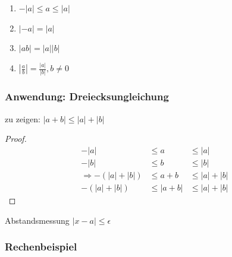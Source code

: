 \begin{enumerate}
 \item $-|a|\leq a \leq |a|$
 \item $|-a| = |a|$
 \item $|ab| = |a||b|$
 \item $\displaystyle\left|\frac{a}{b}\right| = \frac{|a|}{|b|}, b\neq 0$
\end{enumerate}

\subsubsection*{Anwendung: Dreiecksungleichung}
zu zeigen: $|a+b| \leq |a|+|b|$
\begin{proof}
  \begin{align*}
    -|a|&\leq a &\leq |a| \\
    -|b|&\leq b &\leq |b| \\
    \Rightarrow -(|a|+|b|)&\leq a+b &\leq |a|+|b| \\
    -(|a|+|b|)&\leq |a+b| &\leq |a|+|b|
  \end{align*}
\end{proof}

Abstandsmessung $|x-a| \leq \epsilon$

\subsubsection*{Rechenbeispiel}

